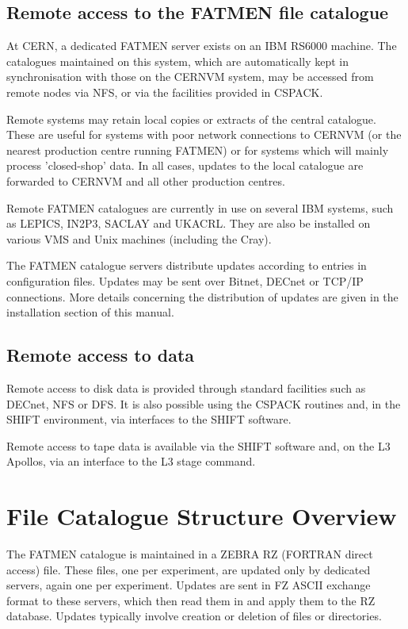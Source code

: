 \section{Remote access to the FATMEN file catalogue}
\par
{}
At CERN, a dedicated FATMEN server exists on an IBM RS6000
machine. The catalogues maintained on this system, which are
automatically kept in synchronisation with those on the CERNVM system,
may be accessed from remote nodes via NFS, or via the facilities
provided in CSPACK.
\par
Remote systems may retain local copies or extracts
of the central catalogue. These are useful for systems with
poor network connections to CERNVM (or the nearest production
centre running FATMEN) or for systems which will mainly process
'closed-shop' data. In all cases, updates to the local catalogue
are forwarded to CERNVM and all other production centres.
\par
Remote FATMEN catalogues are currently in use on several IBM systems,
such as LEPICS, IN2P3, SACLAY and UKACRL. They are also be
installed on various VMS and Unix machines (including the Cray).
\par
The FATMEN catalogue servers distribute updates according
to entries in configuration files. Updates may be sent
over Bitnet, DECnet or TCP/IP connections.
More details concerning the distribution of updates are given
in the installation section of this manual.
\section{Remote access to data}
\par
{}
Remote access to disk data is provided through standard facilities
such as DECnet, NFS or DFS. It is also possible using the
CSPACK routines and, in the SHIFT environment, via interfaces
to the SHIFT software.
\par
{}
Remote access to tape data is available via the SHIFT software
and, on the L3 Apollos, via an interface to the L3 stage command.

\chapter{File Catalogue Structure Overview}
\par
The FATMEN catalogue is maintained in a ZEBRA RZ (FORTRAN direct access)
file. These files, one per experiment, are updated only by dedicated
servers, again one per experiment.
Updates are sent in
FZ ASCII exchange format to these servers,
which then read them in and apply them to the RZ database.
Updates typically involve creation or deletion of
files or directories.
